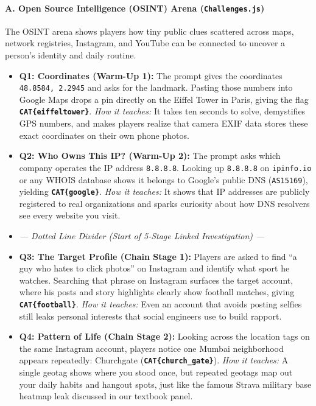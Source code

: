 \documentclass[11pt,a4paper]{article}
\begin{document}
\paragraph{A. Open Source Intelligence (OSINT) Arena (\texttt{Challenges.js})}
The OSINT arena shows players how tiny public clues scattered across maps, network registries, Instagram, and YouTube can be connected to uncover a person's identity and daily routine.
\begin{itemize}
    \item \textbf{Q1: Coordinates (Warm-Up 1):} The prompt gives the coordinates \texttt{48.8584, 2.2945} and asks for the landmark. Pasting those numbers into Google Maps drops a pin directly on the Eiffel Tower in Paris, giving the flag \textbf{\texttt{CAT\{eiffeltower\}}}. \textit{How it teaches:} It takes ten seconds to solve, demystifies GPS numbers, and makes players realize that camera EXIF data stores these exact coordinates on their own phone photos.
    \item \textbf{Q2: Who Owns This IP? (Warm-Up 2):} The prompt asks which company operates the IP address \texttt{8.8.8.8}. Looking up \texttt{8.8.8.8} on \texttt{ipinfo.io} or any WHOIS database shows it belongs to Google's public DNS (\texttt{AS15169}), yielding \textbf{\texttt{CAT\{google\}}}. \textit{How it teaches:} It shows that IP addresses are publicly registered to real organizations and sparks curiosity about how DNS resolvers see every website you visit.
    \item \textit{--- Dotted Line Divider (Start of 5-Stage Linked Investigation) ---}
    \item \textbf{Q3: The Target Profile (Chain Stage 1):} Players are asked to find ``a guy who hates to click photos'' on Instagram and identify what sport he watches. Searching that phrase on Instagram surfaces the target account, where his posts and story highlights clearly show football matches, giving \textbf{\texttt{CAT\{football\}}}. \textit{How it teaches:} Even an account that avoids posting selfies still leaks personal interests that social engineers use to build rapport.
    \item \textbf{Q4: Pattern of Life (Chain Stage 2):} Looking across the location tags on the same Instagram account, players notice one Mumbai neighborhood appears repeatedly: Churchgate (\textbf{\texttt{CAT\{church\_gate\}}}). \textit{How it teaches:} A single geotag shows where you stood once, but repeated geotags map out your daily habits and hangout spots, just like the famous Strava military base heatmap leak discussed in our textbook panel.

\end{itemize}
\end{document}
